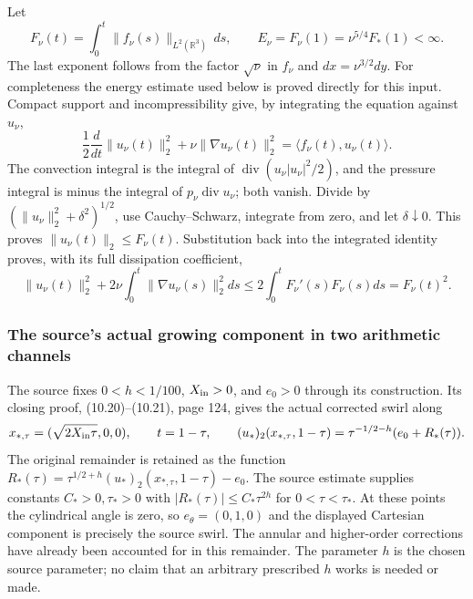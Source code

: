 Let
\[
 F_\nu(t)=\int_0^t\|f_\nu(s)\|_{L^2(\mathbb R^3)}\,ds,
 \qquad E_\nu=F_\nu(1)=\nu^{5/4}F_*(1)<\infty.
\]
The last exponent follows from the factor $\sqrt\nu$ in $f_\nu$ and
$dx=\nu^{3/2}dy$. For completeness the energy estimate used below is
proved directly for this input. Compact support and incompressibility
give, by integrating the equation against $u_\nu$,
\[
 \frac12\frac{d}{dt}\|u_\nu(t)\|_2^2
       +\nu\|\nabla u_\nu(t)\|_2^2
       =\langle f_\nu(t),u_\nu(t)\rangle.
\]
The convection integral is the integral of
$\operatorname{div}(u_\nu|u_\nu|^2/2)$, and the pressure integral is
minus the integral of $p_\nu\operatorname{div}u_\nu$; both vanish.
Divide by $(\|u_\nu\|_2^2+\delta^2)^{1/2}$, use Cauchy--Schwarz,
integrate from zero, and let $\delta\downarrow0$. This proves
$\|u_\nu(t)\|_2\leq F_\nu(t)$. Substitution back into the integrated
identity proves, with its full dissipation coefficient,
\[
 \|u_\nu(t)\|_2^2+2\nu\int_0^t\|\nabla u_\nu(s)\|_2^2ds
 \leq 2\int_0^t F_\nu'(s)F_\nu(s)ds=F_\nu(t)^2.
\]

\subsubsection{The source's actual growing component in two arithmetic channels}

The source fixes $0<h<1/100$, $X_{\rm in}>0$, and $e_0>0$ through
its construction. Its closing proof, (10.20)--(10.21), page 124, gives
the actual corrected swirl along
\[
 x_{*,\tau}=(\sqrt{2X_{\rm in}\tau},0,0),\qquad t=1-\tau,
 \qquad
 (u_*)_2(x_{*,\tau},1-\tau)
   =\tau^{-1/2-h}(e_0+R_*(\tau)).
\]
The original remainder is retained as the function
$R_*(\tau)=\tau^{1/2+h}(u_*)_2(x_{*,\tau},1-\tau)-e_0$.
The source estimate supplies constants $C_*>0,\tau_*>0$ with
$|R_*(\tau)|\leq C_*\tau^{2h}$ for $0<\tau<\tau_*$.
At these points the cylindrical angle is zero, so
$e_\theta=(0,1,0)$ and the displayed Cartesian component is precisely
the source swirl. The annular and higher-order corrections have already
been accounted for in this remainder. The parameter $h$ is the chosen
source parameter; no claim that an arbitrary prescribed $h$ works is
needed or made.


